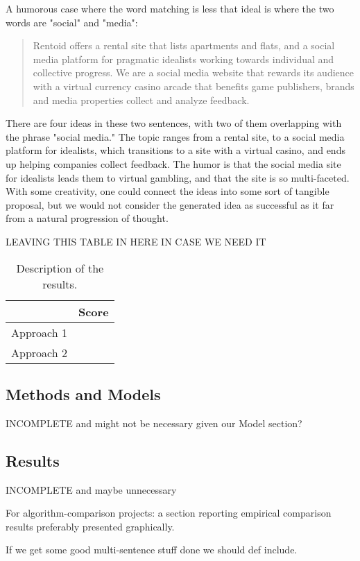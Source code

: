 \documentclass[11pt]{article}
\begin{document}
A humorous case where the word matching is less that ideal is where the two words are "social" and "media":
\begin{quote}
Rentoid offers a rental site that lists apartments and flats, and a social media platform for pragmatic idealists working towards individual and collective progress. We are a social media website that rewards its audience with a virtual currency casino arcade that benefits game publishers, brands and media properties collect and analyze feedback.
\end{quote}
There are four ideas in these two sentences, with two of them overlapping with the phrase "social media." The topic ranges from a rental site, to a social media platform for idealists, which transitions to a site with a virtual casino, and ends up helping companies collect feedback. The humor is that the social media site for idealists leads them to virtual gambling, and that the site is so multi-faceted. With some creativity, one could connect the ideas into some sort of tangible proposal, but we would not consider the generated idea as successful as it far from a natural progression of thought.

LEAVING THIS TABLE IN HERE IN CASE WE NEED IT
\begin{table}
  \centering
  \begin{tabular}{ll}
    \toprule
    & Score \\
    \midrule
    Approach 1 & \\
    Approach 2 & \\
    \bottomrule
  \end{tabular}
  \caption{Description of the results.}
\end{table}

\subsection{Methods and Models}
INCOMPLETE and might not be necessary given our Model section?

\subsection{Results}
INCOMPLETE and maybe unnecessary

For algorithm-comparison projects: a section reporting empirical comparison results preferably presented graphically.

If we get some good multi-sentence stuff done we should def include.
\end{document}
